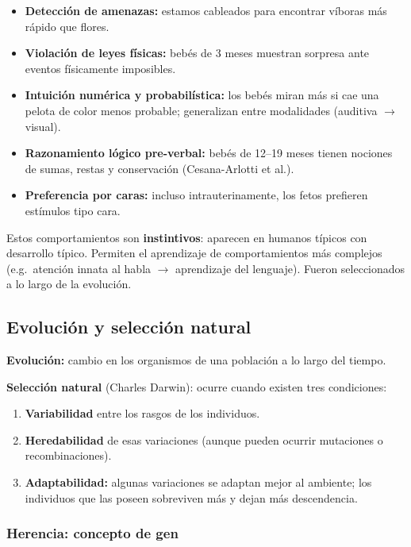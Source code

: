 \documentclass[11pt, a4paper]{article}
\begin{document}
\begin{itemize}[nosep]
    \item \textbf{Detecci\'on de amenazas:} estamos cableados para encontrar v\'iboras m\'as r\'apido que flores.
    \item \textbf{Violaci\'on de leyes f\'isicas:} beb\'es de 3 meses muestran sorpresa ante eventos f\'isicamente imposibles.
    \item \textbf{Intuici\'on num\'erica y probabil\'istica:} los beb\'es miran m\'as si cae una pelota de color menos probable; generalizan entre modalidades (auditiva $\to$ visual).
    \item \textbf{Razonamiento l\'ogico pre-verbal:} beb\'es de 12--19 meses tienen nociones de sumas, restas y conservaci\'on (Cesana-Arlotti et al.).
    \item \textbf{Preferencia por caras:} incluso intrauterinamente, los fetos prefieren est\'imulos tipo cara.
\end{itemize}

Estos comportamientos son \textbf{instintivos}: aparecen en humanos t\'ipicos con desarrollo t\'ipico. Permiten el aprendizaje de comportamientos m\'as complejos (e.g.\ atenci\'on innata al habla $\to$ aprendizaje del lenguaje). Fueron seleccionados a lo largo de la evoluci\'on.

\subsection{Evoluci\'on y selecci\'on natural}

\textbf{Evoluci\'on:} cambio en los organismos de una poblaci\'on a lo largo del tiempo.

\textbf{Selecci\'on natural} (Charles Darwin): ocurre cuando existen tres condiciones:
\begin{enumerate}[nosep]
    \item \textbf{Variabilidad} entre los rasgos de los individuos.
    \item \textbf{Heredabilidad} de esas variaciones (aunque pueden ocurrir mutaciones o recombinaciones).
    \item \textbf{Adaptabilidad:} algunas variaciones se adaptan mejor al ambiente; los individuos que las poseen sobreviven m\'as y dejan m\'as descendencia.
\end{enumerate}

\subsubsection{Herencia: concepto de gen}
\end{document}
